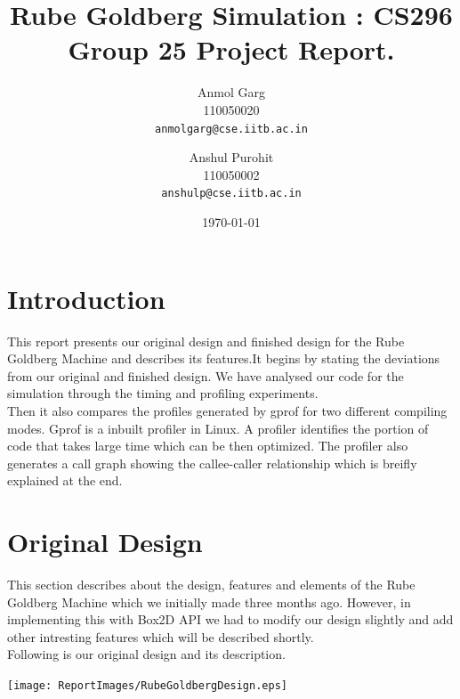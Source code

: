 \documentclass[11pt, a4paper]{article}
\begin{document}
\title{Rube Goldberg Simulation : CS296 Group 25 Project Report.}
\author{Anmol Garg\\
110050020\\
\texttt{anmolgarg@cse.iitb.ac.in}\\
\and
Anshul Purohit\\
110050002\\
\texttt{anshulp@cse.iitb.ac.in}}
\date{\today}
\maketitle

\fontsize{11pt}{15pt}\selectfont

\section{Introduction}
This report presents our original design and finished design for the Rube Goldberg Machine \cite{RG} and describes its features.It begins by stating the deviations from our original and finished design. We have analysed our code for the simulation through the timing and profiling experiments. \\
Then it also compares the profiles generated by gprof for two different compiling modes. Gprof \cite{GProf} is a inbuilt profiler in Linux. A profiler identifies the portion of code that takes large time which can be then optimized. The profiler also generates a call graph showing the callee-caller relationship which is breifly explained at the end.

\section{Original Design}

This section describes about the design, features and elements of the Rube Goldberg Machine which we initially made three months ago. However, in implementing this with Box2D \cite{Box2D} API we had to modify our design slightly and add other intresting features which will be described shortly. \\

Following is our original design and its description. \\

\begin{center}
\texttt{[image: ReportImages/RubeGoldbergDesign.eps]}
\end{center} 
\end{document}
